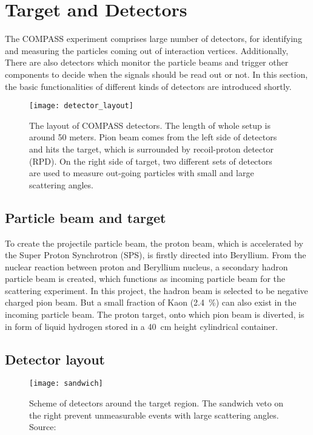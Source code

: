 \section{Target and Detectors}
The COMPASS experiment comprises large number of detectors, for identifying and measuring the particles coming out of interaction vertices. Additionally, There are also detectors which monitor the particle beams and trigger other components to decide when the signals should be read out or not. In this section, the basic functionalities of different kinds of detectors are introduced shortly. 

\begin{figure*}[!ht]
	\centering
	\texttt{[image: detector\_layout]}
	\caption{The layout of COMPASS detectors. The length of whole setup is around 50 meters. Pion beam comes from the left side of detectors and hits the target, which is surrounded by recoil-proton detector (RPD). On the right side of target, two different sets of detectors are used to measure out-going particles with small and large scattering angles.}
	\label{fig:detec_layout}	
\end{figure*}

\subsection{Particle beam and target}
To create the projectile particle beam, the proton beam, which is accelerated by the Super Proton Synchrotron (SPS), is firstly directed into Beryllium. From the nuclear reaction between proton and Beryllium nucleus, a secondary hadron particle beam is created, which functions as incoming particle beam for the scattering experiment. In this project, the hadron beam is selected to be negative charged pion beam. But a small fraction of Kaon (\SI{2.4}{\percent}) can also exist in the incoming particle beam. The proton target, onto which pion beam is diverted, is in form of liquid hydrogen stored in a \SI{40}{\centi\meter} height cylindrical container. 

\subsection{Detector layout}
\label{subsec:Detector_layout}
\begin{figure}[!th]
	\centering
	\texttt{[image: sandwich]}
	\caption{Scheme of detectors around the target region. The sandwich veto on the right prevent unmeasurable events with large scattering angles. Source: \cite{sandwich}}
	\label{fig:sandwich}
\end{figure}

